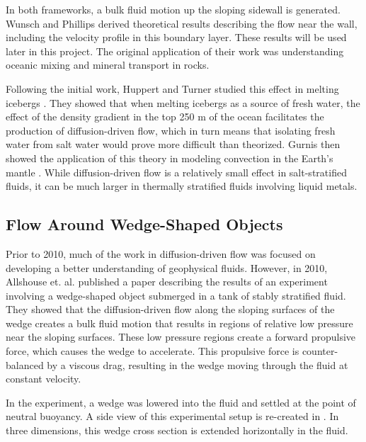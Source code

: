\documentclass[12pt]{article}
\begin{document}

In both frameworks, a bulk fluid motion up the sloping sidewall is generated. Wunsch and Phillips derived theoretical results describing the flow near the wall, including the velocity profile in this boundary layer. These results will be used later in this project. The original application of their work was understanding oceanic mixing and mineral transport in rocks.

Following the initial work, Huppert and Turner studied this effect in melting icebergs \cite{huppert_icebergs}. They showed that when melting icebergs as a source of fresh water, the effect of the density gradient in the top 250 m of the ocean facilitates the production of diffusion-driven flow, which in turn means that isolating fresh water from salt water would prove more difficult than theorized. Gurnis then showed the application of this theory in modeling convection in the Earth's mantle \cite{gurnis_mantle}. While diffusion-driven flow is a relatively small effect in salt-stratified fluids, it can be much larger in thermally stratified fluids involving liquid metals.

\subsection{Flow Around Wedge-Shaped Objects}

Prior to 2010, much of the work in diffusion-driven flow was focused on developing a better understanding of geophysical fluids. However, in 2010, Allshouse et. al. published a paper \cite{allshouse2010propulsion} describing the results of an experiment involving a wedge-shaped object submerged in a tank of stably stratified fluid. They showed that the diffusion-driven flow along the sloping surfaces of the wedge creates a bulk fluid motion that results in regions of relative low pressure near the sloping surfaces. These low pressure regions create a forward propulsive force, which causes the wedge to accelerate. This propulsive force is counter-balanced by a viscous drag, resulting in the wedge moving through the fluid at constant velocity.

In the experiment, a wedge was lowered into the fluid and settled at the point of neutral buoyancy. A side view of this experimental setup is re-created in . In three dimensions, this wedge cross section is extended horizontally in the fluid.
\end{document}

